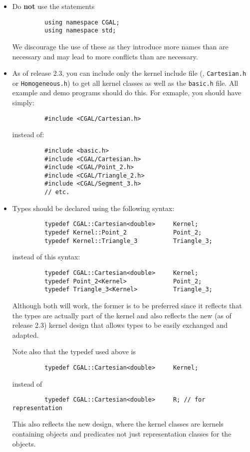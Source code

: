 \begin{itemize}
   \item Do \textbf{not} use the statements 
         \begin{verbatim}
         using namespace CGAL;
         using namespace std;
         \end{verbatim}
         We discourage the use of these as they introduce more names than
         are necessary and may lead to more conflicts than are necessary.
   \item As of release 2.3, you can include only the kernel include file
         (\eg, \texttt{Cartesian.h} or \texttt{Homogeneous.h}) to get all
         kernel classes as well as the \texttt{basic.h} file.  All example
         and demo programs should do this.  For exmaple, you should have
         simply:
         \begin{verbatim}
         #include <CGAL/Cartesian.h>
         \end{verbatim}
         instead of:
         \begin{verbatim}
         #include <basic.h>
         #include <CGAL/Cartesian.h>
         #include <CGAL/Point_2.h>
         #include <CGAL/Triangle_2.h>
         #include <CGAL/Segment_3.h>
         // etc.
         \end{verbatim}
   \item Types should be declared using the following syntax:
         \begin{verbatim}
         typedef CGAL::Cartesian<double>     Kernel;
         typedef Kernel::Point_2             Point_2;
         typedef Kernel::Triangle_3          Triangle_3;
         \end{verbatim}
         instead of this syntax:
         \begin{verbatim}
         typedef CGAL::Cartesian<double>     Kernel;
         typedef Point_2<Kernel>             Point_2;
         typedef Triangle_3<Kernel>          Triangle_3;
         \end{verbatim}
         Although both will work, the former is to be preferred since
         it reflects that the types are actually part of the kernel and
         also reflects the new (as of release 2.3) kernel design that allows
         types to be easily exchanged and adapted.  
    
         Note also that the typedef used above is
         \begin{verbatim}
         typedef CGAL::Cartesian<double>     Kernel;
         \end{verbatim}
         instead of
         \begin{verbatim}
         typedef CGAL::Cartesian<double>     R; // for representation
         \end{verbatim}
         This also reflects the new design, where the kernel classes are
         kernels containing objects and predicates not just representation
         classes for the objects.
\end{itemize}

